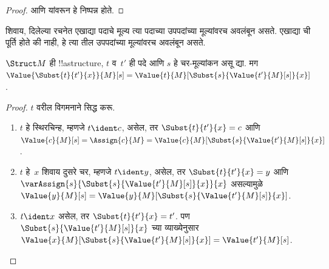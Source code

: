 \documentclass[../../../include/open-logic-section]{subfiles}
\begin{document}
\begin{proof}
 आणि  यांवरून
हे निष्पन्न होते.
\end{proof}

शिवाय, दिलेल्या रचनेत एखाद्या पदाचे मूल्य त्या पदाच्या उपपदांच्या
मूल्यांवरच अवलंबून असते. एखाद्या ची पूर्ति होते की
नाही, हे त्या तील उपपदांच्या मूल्यांवरच अवलंबून असते.

\begin{prop}
$\Struct M$ ही !!a{structure}, $t$ व~$t'$ ही पदे आणि $s$ हे
चर-मूल्यांकन असू द्या. मग $\Value{\Subst{t}{t'}{x}}{M}[s] =
\Value{t}{M}[\Subst{s}{\Value{t'}{M}[s]}{x}]$.
\end{prop}

\begin{proof}
$t$ वरील विगमनाने सिद्ध करू.
\begin{enumerate}
\item $t$ हे स्थिरचिन्ह, म्हणजे $t\ident c$, असेल, तर
  $\Subst{t}{t'}{x} = c$ आणि $\Value{c}{M}[s] = \Assign{c}{M} =
  \Value{c}{M}[\Subst{s}{\Value{t'}{M}[s]}{x}]$.

\item $t$ हे~$x$ शिवाय दुसरे चर, म्हणजे $t \ident y$, असेल, तर
  $\Subst{t}{t'}{x} = y$ आणि
  $\varAssign{s}{\Subst{s}{\Value{t'}{M}[s]}{x}}{x}$ असल्यामुळे
  $\Value{y}{M}[s] =
  \Value{y}{M}[\Subst{s}{\Value{t'}{M}[s]}{x}]$.

\item $t \ident x$ असेल, तर $\Subst{t}{t'}{x} = t'$. पण
  $\Subst{s}{\Value{t'}{M}[s]}{x}$ च्या व्याख्येनुसार
  $\Value{x}{M}[\Subst{s}{\Value{t'}{M}[s]}{x}] = \Value{t'}{M}[s]$.


\end{enumerate}
\end{proof}
\end{document}
